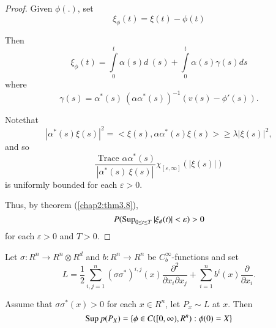 \begin{proof}
Given $\phi(.)$, set
$$
\xi_{\phi}(t)=\xi(t)-\phi(t)
$$

Then
$$
\xi_{\phi}(t)= \int\limits_0^t \alpha(s)d~(s)+ \int\limits_0^t \alpha
(s)\gamma(s)ds 
$$
where
$$
\gamma(s)=\alpha^*(s)~(\alpha\alpha^*(s))^{-1}(v(s)-\phi'(s)). 
$$

Note\pageoriginale that
$$
|\alpha^*(s)\xi(s)|^2=<\xi(s), \alpha \alpha^*(s)\xi(s)>\geq \lambda
|\xi(s)|^2, 
$$
and so
$$
\frac{\text{ Trace }\alpha \alpha^*(s)}{|\alpha^*(s)~\xi (s)|}
\chi_{[\varepsilon, \infty]}(|\xi(s)|) 
$$
is uniformly bounded for each $\varepsilon > 0$. 

Thus, by theorem (\ref{chap2:thm3.8}),
$$
P(\operatorname{Sup}_{0 \leq t \leq T}|\xi_{\phi}(t)|< \varepsilon) > 0 
$$
for each $\varepsilon > 0$ and $T > 0$.
\end{proof}

\begin{coro}\label{chap2:coro3.10} %
Let $\sigma : R^n \to R^n \otimes R^d$ and $b:R^n \to R^n$ be
$C_b^{\infty}$-functions and set 
$$
L=\frac{1}{2}\sum_{i,j=1}^n (\sigma 
\sigma^*)^{i,j}(x)\frac{\partial^2}{\partial x_i \partial
  x_j}+\sum_{i=1}^n b^i(x) \frac{\partial}{\partial x_i}. 
$$

Assume that $\sigma \sigma^*(x)>0$ for each $x \in R^n$, let $P_x \sim
L$ at $x$. Then 
$$
\operatorname{Sup} p (P_X)=\{\phi \in C([0, \infty), R^n) : \phi(0)=X \}
$$
\end{coro}

